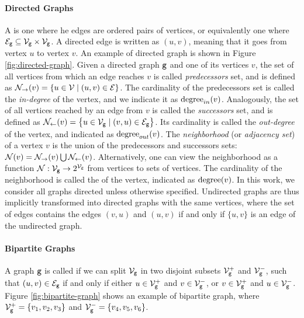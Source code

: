\paragraph{Directed Graphs}
A  is one where he edges are ordered pairs of vertices, or equivalently one where $\Edges_{\Graph{g}}\subseteq \Nodes_{\Graph{g}}\times \Nodes_{\Graph{g}}$. A directed edge is written as $(u, v)$, meaning that it goes from vertex $u$ to vertex $v$. An example of directed graph is shown in Figure \ref{fig:directed-graph}. Given a directed graph $\mathtt{g}$ and one of its vertices $v$, the set of all vertices from which an edge reaches $v$ is called \emph{predecessors} set, and is defined as $\Pred(v) = \Set{u \in \Nodes \mid (u,v) \in \Edges}$. The cardinality of the predecessors set is called the \emph{in-degree} of the vertex, and we indicate it as $\mathrm{degree}_{in}(v)$. Analogously, the set of all vertices reached by an edge from $v$ is called the \emph{successors} set, and is defined as $\Succ(v) = \Set{u \in \Nodes_{\Graph{g}}\mid (v,u) \in \Edges_{\Graph{g}}}$. Its cardinality is called the \emph{out-degree} of the vertex, and indicated as $\mathrm{degree}_{out}(v)$. The \emph{neighborhood} (or \emph{adjacency set}) of a vertex $v$ is the union of the predecessors and successors sets: $\Neigh(v) = \Pred(v) \bigcup \Succ(v)$. Alternatively, one can view the neighborhood as a function $\Neigh: \Nodes_{\Graph{g}}\shortrightarrow 2^{\Nodes_{\Graph{g}}}$ from vertices to sets of vertices. The cardinality of the neighborhood is called the  of the vertex, indicated as $\mathrm{degree}(v)$.  In this work, we consider all graphs directed unless otherwise specified. Undirected graphs are thus implicitly transformed into directed graphs with the same vertices, where the set of edges contains the edges $(v,u)$ and $(u,v)$ if and only if $\{u,v\}$ is an edge of the undirected graph.

\paragraph{Bipartite Graphs}
A graph $\mathtt{g}$ is called  if we can split $\Nodes_{\Graph{g}}$ in two disjoint subsets $\Nodes_{\Graph{g}}^{+}$ and $\Nodes_{\Graph{g}}^{-}$, such that $(u, v) \in \Edges_{\Graph{g}}$ if and only if either $u \in \Nodes_{\Graph{g}}^{+}$ and $v \in \Nodes_{\Graph{g}}^{-}$, or $v \in \Nodes_{\Graph{g}}^{+}$ and $u \in \Nodes_{\Graph{g}}^{-}$. Figure \ref{fig:bipartite-graph} shows an example of bipartite graph, where
$\Nodes_{\Graph{g}}^{+} = \Set{v_1, v_2, v_3}$ and $\Nodes_{\Graph{g}}^{-} = \Set{v_4, v_5, v_6}$.


